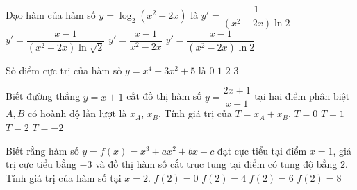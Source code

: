 \begin{ex}%
	Đạo hàm của hàm số $y=\log_2\left(x^2-2x\right)$ là
	\choice
	{$y'=\dfrac{1}{(x^2-2x)\ln 2}$}
	{\True $y'=\dfrac{x-1}{(x^2-2x)\ln \sqrt{2}}$}
	{$y'=\dfrac{x-1}{x^2-2x}$}
	{$y'=\dfrac{x-1}{(x^2-2x)\ln 2}$}
\end{ex}

\begin{ex}%
	Số điểm cực trị của hàm số $y=x^4-3x^2+5$ là
	\choice
	{$0$}
	{$1$}
	{$2$}
	{\True $3$}
\end{ex}

\begin{ex}%
	Biết đường thẳng $y=x+1$ cắt đồ thị hàm số $y=\dfrac{2x+1}{x-1}$ tại hai điểm phân biệt $A,B$ có hoành độ lần lượt là $x_A$, $x_B$. Tính giá trị của $T=x_A+x_B$.
	\choice
	{$T=0$}
	{$T=1$}
	{\True $T=2$}
	{$T=-2$}
\end{ex}

\begin{ex}%
	Biết rằng hàm số $y=f(x)=x^3+ax^2+bx+c$ đạt cực tiểu tại điểm $x=1$, giá trị cực tiểu bằng $-3$ và đồ thị hàm số cắt trục tung tại điểm có tung độ bằng $2$. Tính giá trị của hàm số tại $x=2$.
	\choice
	{$f(2)=0$}
	{\True $f(2)=4$}
	{$f(2)=6$}
	{$f(2)=8$}
\end{ex}

